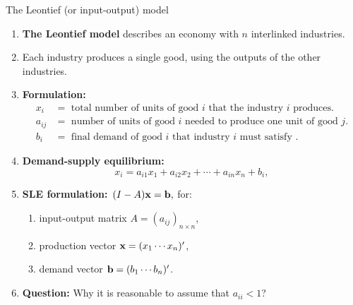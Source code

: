 \documentclass[9pt]{beamer}
\begin{document}
\begin{frame}{The Leontief (or input-output) model}

    \begin{enumerate}[leftmargin = 0.6cm, label = $\bullet$, rightmargin = 0.4cm]

        \item \textbf{The Leontief model} describes an economy with $n$ interlinked industries.
        
        \item Each industry produces a single good, using the outputs of the other industries. 

        \item \textbf{Formulation:}
        \begin{align*}
            x_i &= \text{ total number of units of good } i \text{ that the industry } i \text{ produces.} \\     
            a_{ij} &= \text{ number of units of good } i \text{ needed to produce one unit of good } j. \\
            b_i &= \text{ final demand of good } i \text{ that industry } i \text{ must satisfy }.
        \end{align*}

        \item \textbf{Demand-supply equilibrium:} 
        $$
        x_i = a_{i1}x_1 + a_{i2}x_2 + \cdots + a_{in}x_n + b_i,
        $$

        \item \textbf{SLE formulation:}\ 
        $
        (I-A){\bf x} = {\bf b},
        $
        for:
        \begin{enumerate}[leftmargin = 0.6cm, label = $\pmb{-}$, rightmargin = 0.4cm]
            \item input-output matrix $A = (a_{ij})_{n\times n}$, 
            \item production vector ${\bf x} = (x_1 \cdots x_n)'$,
            \item demand vector ${\bf b} = (b_1 \cdots b_n)'$.
        \end{enumerate}
        
        \item \textbf{Question:} Why it is reasonable to assume that $a_{ii} < 1$?
    \end{enumerate}
   
\end{frame}
\end{document}

